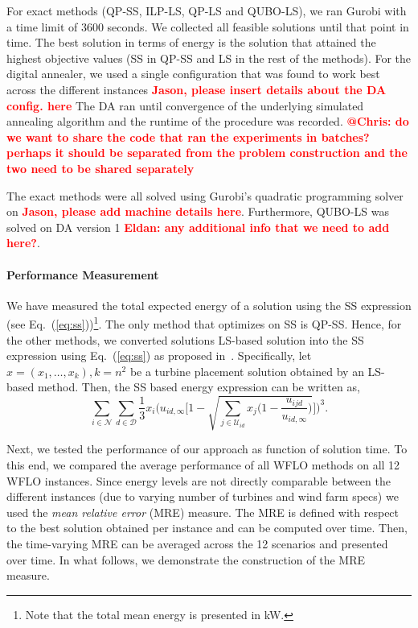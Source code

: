 \documentclass[preprint,12pt]{elsarticle}
\newcommand{\todo}[1]{{\textcolor{red}{\bf {#1}}}}
\begin{document}
For exact methods (QP-SS, ILP-LS, QP-LS and QUBO-LS),
we ran Gurobi with a time limit of 3600 seconds. We collected all feasible solutions
until that point in time. The best solution in terms of energy is the solution that attained the highest objective
values (SS in QP-SS and LS in the rest of the methods).
For the digital annealer, we used a single configuration that was found to work best across the different instances \todo{Jason, please insert details about the DA config. here} The DA ran until convergence of the underlying simulated annealing algorithm and the runtime 
of the procedure was recorded. \todo{@Chris: do we want to share the code that ran the experiments in batches? perhaps it should be separated from the problem construction and the two need to be shared separately} 

The exact methods were all solved using Gurobi's quadratic programming solver on \todo{Jason, please add machine details here}. Furthermore, QUBO-LS was solved on DA version 1 \todo{Eldan: any additional info that we need to add here?}.

\paragraph{Performance Measurement} 

We have measured the total expected energy of a solution using the SS expression (see Eq.~(\ref{eq:ss}))\footnote{Note that the total mean energy is presented in kW.}.
The only method that optimizes on SS is QP-SS. Hence, for the other methods, we converted solutions
LS-based solution into the SS expression using Eq.~(\ref{eq:ss}) as proposed in~\cite{Zhang2014}. Specifically, let $x = (x_1, \ldots, x_k), k=n^2$ be a turbine placement solution obtained by an LS-based method.
Then, the SS based energy expression can be written as, 
$$\sum_{i\in \mathcal{N}}\sum_{d \in \mathcal{D}} \frac{1}{3} x_i \Bigg(u_{id,\infty} \Bigg[1-\sqrt{\sum_{j\in \mathcal{U}_{id}}x_j\bigg( 1-\frac{u_{ijd}}{u_{id,\infty}} \bigg) } \Bigg]    \Bigg)^3.$$ 

Next, we tested the performance of our approach as function of solution time. To this end, we 
compared the average performance of all WFLO methods on all 12 WFLO instances. Since energy levels are not directly comparable between the different instances (due to varying number of turbines and wind farm specs) we used the \emph{mean relative error} (MRE) measure. The MRE is defined with respect to the best solution obtained per instance and can be computed over time. Then, the
time-varying MRE can be averaged across the 12 scenarios and presented over time. In what follows, we demonstrate the construction of the MRE measure.
\end{document}
